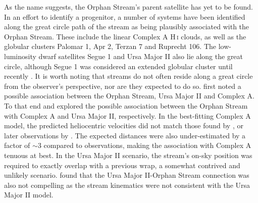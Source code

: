 \documentclass{emulateapj}
\begin{document}
As the name suggests, the Orphan Stream's parent satellite has yet to be found. In an effort to identify a progenitor, a number of systems have been identified along the great circle path of the stream as being plausibly associated with the Orphan Stream. These include the linear Complex A H\,\textsc{i} clouds, as well as the globular clusters Palomar 1, Apr 2, Terzan 7 and Ruprecht 106. The low-luminosity dwarf satellites Segue 1 and Ursa Major II also lie along the great circle, although Segue 1 was considered an extended globular cluster until recently \citep{norris;et-al_2010,simon;et-al_2011}. It is worth noting that streams do not often reside along a great circle from the observer's perspective, nor are they expected to do so. \citet{belokurov;et-al_2007} first noted a possible association between the Orphan Stream, Ursa Major II and Complex A. To that end \citet{Jin;Lynden-Bell_2007} and \citet{fellhaur;et-al_2007} explored the possible association between the Orphan Stream with Complex A and Ursa Major II, respectively. In the best-fitting Complex A model, the predicted heliocentric velocities did not match those found by \citet{belokurov;et-al_2007}, or later observations by \citet{newberg;et-al_2010}. The expected distances were also under-estimated by a factor of $\sim{}3$ compared to observations, making the association with Complex A tenuous at best. In the Ursa Major II scenario, the stream's on-sky position was required to exactly overlap with a previous wrap, a somewhat contrived and unlikely scenario. \citet{newberg;et-al_2010} found that the Ursa Major II-Orphan Stream connection was also not compelling as the stream kinematics were not consistent with the Ursa Major II model.
\end{document}
